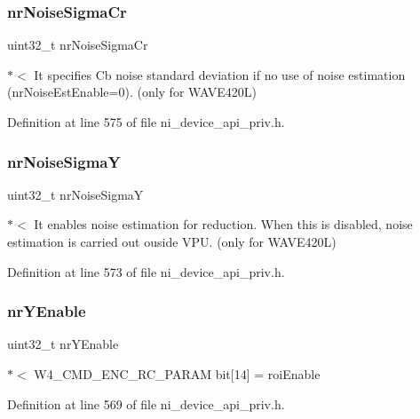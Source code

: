 \subsubsection{\texorpdfstring{nrNoiseSigmaCr}{nrNoiseSigmaCr}}
{\footnotesize\ttfamily uint32\+\_\+t nr\+Noise\+Sigma\+Cr}

$\ast$$<$ It specifies Cb noise standard deviation if no use of noise estimation (nr\+Noise\+Est\+Enable=0). (only for W\+A\+V\+E420L) 

Definition at line 575 of file ni\+\_\+device\+\_\+api\+\_\+priv.\+h.

\mbox{\label{struct__ni__encoder__change__params__t_a56f22b5e6fafd5a1e4020b03324ba78d}} 
\subsubsection{\texorpdfstring{nrNoiseSigmaY}{nrNoiseSigmaY}}
{\footnotesize\ttfamily uint32\+\_\+t nr\+Noise\+SigmaY}

$\ast$$<$ It enables noise estimation for reduction. When this is disabled, noise estimation is carried out ouside V\+PU. (only for W\+A\+V\+E420L) 

Definition at line 573 of file ni\+\_\+device\+\_\+api\+\_\+priv.\+h.

\mbox{\label{struct__ni__encoder__change__params__t_a98953814185368ffca54fd85f3b37c85}} 
\subsubsection{\texorpdfstring{nrYEnable}{nrYEnable}}
{\footnotesize\ttfamily uint32\+\_\+t nr\+Y\+Enable}

$\ast$$<$ W4\+\_\+\+C\+M\+D\+\_\+\+E\+N\+C\+\_\+\+R\+C\+\_\+\+P\+A\+R\+AM bit\mbox{[}14\mbox{]} = roi\+Enable 

Definition at line 569 of file ni\+\_\+device\+\_\+api\+\_\+priv.\+h.

\mbox{\label{struct__ni__encoder__change__params__t_affcdae80c74d5751541b067c5ab1a861}} 
